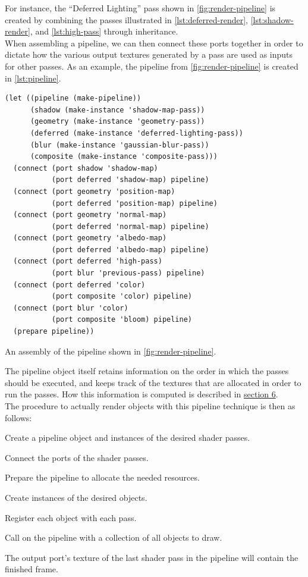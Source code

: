 \documentclass[format=sigconf]{acmart}
\begin{document}
For instance, the ``Deferred Lighting'' pass shown in \autoref{fig:render-pipeline} is created by combining the passes illustrated in \autoref{lst:deferred-render}, \autoref{lst:shadow-render}, and \autoref{lst:high-pass} through inheritance. \\

When assembling a pipeline, we can then connect these ports together in order to dictate how the various output textures generated by a pass are used as inputs for other passes. As an example, the pipeline from \autoref{fig:render-pipeline} is created in \autoref{lst:pipeline}. \\

\begin{listing}[h]
\begin{verbatim}
(let ((pipeline (make-pipeline))
      (shadow (make-instance 'shadow-map-pass))
      (geometry (make-instance 'geometry-pass))
      (deferred (make-instance 'deferred-lighting-pass))
      (blur (make-instance 'gaussian-blur-pass))
      (composite (make-instance 'composite-pass)))
  (connect (port shadow 'shadow-map) 
           (port deferred 'shadow-map) pipeline)
  (connect (port geometry 'position-map)
           (port deferred 'position-map) pipeline)
  (connect (port geometry 'normal-map)
           (port deferred 'normal-map) pipeline)
  (connect (port geometry 'albedo-map)
           (port deferred 'albedo-map) pipeline)
  (connect (port deferred 'high-pass)
           (port blur 'previous-pass) pipeline)
  (connect (port deferred 'color)
           (port composite 'color) pipeline)
  (connect (port blur 'color)
           (port composite 'bloom) pipeline)
  (prepare pipeline))
\end{verbatim}
\caption{An assembly of the pipeline shown in \autoref{fig:render-pipeline}.}
\label{lst:pipeline}
\end{listing}

The pipeline object itself retains information on the order in which the passes should be executed, and keeps track of the textures that are allocated in order to run the passes. How this information is computed is described in \hyperref[allocation]{section 6}. \\

The procedure to actually render objects with this pipeline technique is then as follows:

\begin{step}
\item Create a pipeline object and instances of the desired shader passes.
\item Connect the ports of the shader passes.
\item Prepare the pipeline to allocate the needed resources.
\item Create instances of the desired objects.
\item Register each object with each pass.
\item Call  on the pipeline with a collection of all objects to draw.
\item The output port's texture of the last shader pass in the pipeline will contain the finished frame.
\end{step}
\end{document}
